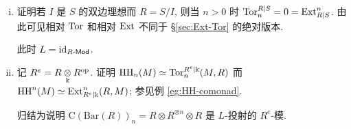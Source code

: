 \begin{Exercises}
\begin{enumerate}[(i)]
		\item 证明若 $I$ 是 $S$ 的双边理想而 $R = S/I$, 则当 $n > 0$ 时 $\operatorname{Tor}_n^{R|S} = 0 = \operatorname{Ext}^n_{R|S}$. 由此可见相对 $\operatorname{Tor}$ 和相对 $\operatorname{Ext}$ 不同于 \S\ref{sec:Ext-Tor} 的绝对版本.
		\begin{hint}
			此时 $L = \mathrm{id}_{R\text{-}\mathsf{Mod}}$.
		\end{hint}
		
		\item 记 $R^e = R \underset{\Bbbk}{\otimes} R^{\operatorname{op}}$. 证明 $\operatorname{HH}_n(M) \simeq \operatorname{Tor}^{R^e|\Bbbk}_n(M, R)$ 而 $\operatorname{HH}^n(M) \simeq \operatorname{Ext}_{R^e|\Bbbk}^n(R, M)$; 参见例 \ref{eg:HH-comonad}.
		\begin{hint}
			归结为说明 $\mathrm{C}(\mathrm{Bar}(R))_n = R \otimes R^{\otimes n} \otimes R$ 是 $L$-投射的 $R^e$-模.
		\end{hint}
	\end{enumerate}
\end{Exercises}